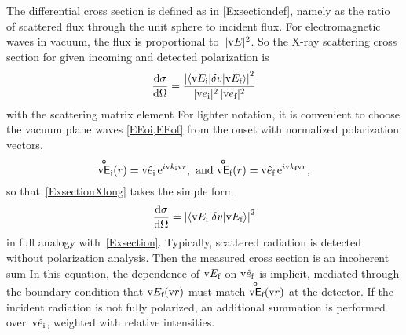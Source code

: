 The differential cross section
is defined as in \cref{Exsectiondef},
namely as the ratio of scattered flux through the unit sphere to incident flux.
%
%
%
For electromagnetic waves in vacuum, the flux is proportional to~$|\text{v}{E}|^2$.
So the X-ray scattering cross section for given incoming and detected polarization is
\begin{equation}\label{ExsectionXlong}
  \frac{\mathrm d\sigma}{\mathrm d\Omega}
  =  \frac{ {\left|\left\langle\text{v}{E}_{\text{i}}|\delta v|\text{v}{E}_{\text{f}}\right\rangle\right|}^2 }{|\text{v}{e}_{\text{i}}|^2\,|\text{v}{e}_{\text{f}}|^2}
\end{equation}
with the scattering matrix element
%
For lighter notation,
it is convenient to choose the vacuum plane waves \cref{EEoi,EEof} from the onset
with normalized polarization vectors,
\begin{equation}\label{EbcE}
  \mathsf{\overset{o}{\text{v}{E}}}_{\text{i}}(r) = \text{v}{\hat e}_{\text{i}}\, \mathrm e^{i\text{v}{k}_{\text{i}}\text{v}{r}}, \text{~and~}
  \mathsf{\overset{o}{\text{v}{E}}}_{\text{f}}(r) = \text{v}{\hat e}_{\text{f}}\, \mathrm e^{i\text{v}{k}_{\text{f}}\text{v}{r}},
\end{equation}
so that~\cref{ExsectionXlong}
takes the simple form
\begin{equation}\label{ExsectionX}
  \frac{\mathrm d\sigma}{\mathrm d\Omega}
  =  {\left|\left\langle\text{v}{E}_{\text{i}}|\delta v|\text{v}{E}_{\text{f}}\right\rangle\right|}^2
\end{equation}
in full analogy with~\cref{Exsection}.
Typically, scattered radiation is detected without polarization analysis.
%
%
%
%
Then the measured cross section is an incoherent sum
%
%
%
%
%
In this equation,
the dependence of $\text{v}{E}_{\text{f}}$ on $\text{v}{\hat e}_{\text{f}}$ is implicit,
mediated through the boundary condition
that $\text{v}{E}_{\text{f}}(\text{v}{r})$ must match $\mathsf{\overset{o}{\text{v}{E}}}_{\text{f}}(\text{v}{r})$ at the detector.
If the incident radiation is not fully polarized,
%
an additional summation is performed over~$\text{v}{\hat e}_{\text{i}}$,
weighted with relative intensities.

%

